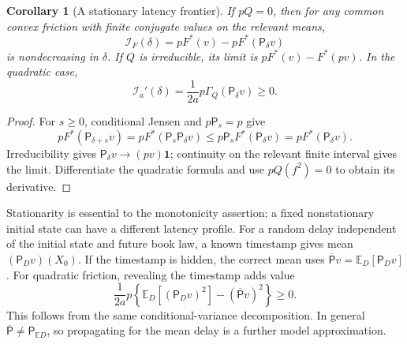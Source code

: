 \documentclass[11pt]{article}
\theoremstyle{plain}
\newtheorem{corollary}[theorem]{Corollary}
\theoremstyle{definition}
\theoremstyle{remark}
\newcommand{\E}{\mathbb E}
\begin{document}
\begin{corollary}[A stationary latency frontier]
\label{cor:stationarylatency}
If \(pQ=0\), then for any common convex friction with finite
conjugate values on the relevant means,
\[
 \mathcal I_F(\delta)
 =pF^*(v)-pF^*(\mathsf P_\delta v)
\]
is nondecreasing in \(\delta\). If \(Q\) is irreducible, its
limit is \(pF^*(v)-F^*(pv)\).
In the quadratic case,
\[
 \mathcal I_a'(\delta)
 =\frac1{2a}p\Gamma_Q(\mathsf P_\delta v)\ge0.
\]
\end{corollary}
\begin{proof}
For \(s\ge0\), conditional Jensen and \(p\mathsf P_s=p\) give
\[
 pF^*(\mathsf P_{\delta+s}v)
 =pF^*(\mathsf P_s\mathsf P_\delta v)
 \le p\mathsf P_sF^*(\mathsf P_\delta v)
 =pF^*(\mathsf P_\delta v).
\]
Irreducibility gives
\(\mathsf P_\delta v\to(pv)\mathbf1\); continuity on the
relevant finite interval gives the limit. Differentiate the
quadratic formula and use \(pQ(f^2)=0\) to obtain its derivative.
\end{proof}

Stationarity is essential to the monotonicity assertion; a fixed
nonstationary initial state can have a different latency profile.
For a random delay independent of the initial state and future
book law, a known timestamp gives mean
\((\mathsf P_Dv)(X_0)\). If the timestamp is hidden, the correct
mean uses \(\overline{\mathsf P}v=\E_D[\mathsf P_Dv]\).
For quadratic friction, revealing the timestamp adds value
\begin{equation}\label{eq:timestampvalue}
 \frac1{2a}p\left\{\E_D[(\mathsf P_Dv)^2]
                   -(\overline{\mathsf P}v)^2\right\}\ge0.
\end{equation}
This follows from the same conditional-variance decomposition.
In general \(\overline{\mathsf P}\ne\mathsf P_{\E D}\), so
propagating for the mean delay is a further model approximation.
\end{document}
